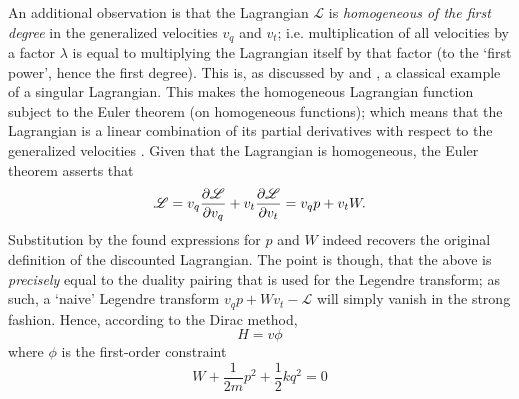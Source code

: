 An additional observation is that the Lagrangian $\mathscr{L}$ is \emph{homogeneous of the first degree} in the generalized velocities $v_q$ and $v_t$; i.e. multiplication of all velocities by a factor $\lambda$ is equal to multiplying the Lagrangian itself by that factor (to the `first power', hence the first degree). This is, as discussed by \citet{Abraham1978} and \citet{Dirac1950}, a classical example of a singular Lagrangian. This makes the homogeneous Lagrangian function subject to the Euler theorem (on homogeneous functions); which means that the Lagrangian is a linear combination of its partial derivatives with respect to the generalized velocities \cite{Dirac1950}. Given that the Lagrangian is homogeneous, the Euler theorem asserts that
$$ \mathscr{L} = v_q \pdv{\mathscr{L}}{v_q} + v_t \pdv{\mathscr{L}}{v_t} = v_q p + v_t W. $$
Substitution by the found expressions for $p$ and $W$ indeed recovers the original definition of the discounted Lagrangian. The point is though, that the above is \emph{precisely} equal to the duality pairing that is used for the Legendre transform; as such, a `naive' Legendre transform $v_q p + Wv_t - \mathscr{L}$ will simply vanish in the strong fashion. Hence, according to the Dirac method,
$$ H = v\phi $$
where $\phi$ is the first-order constraint
$$ W + \frac{1}{2m}p^2 + \frac{1}{2}kq^2 = 0 $$

